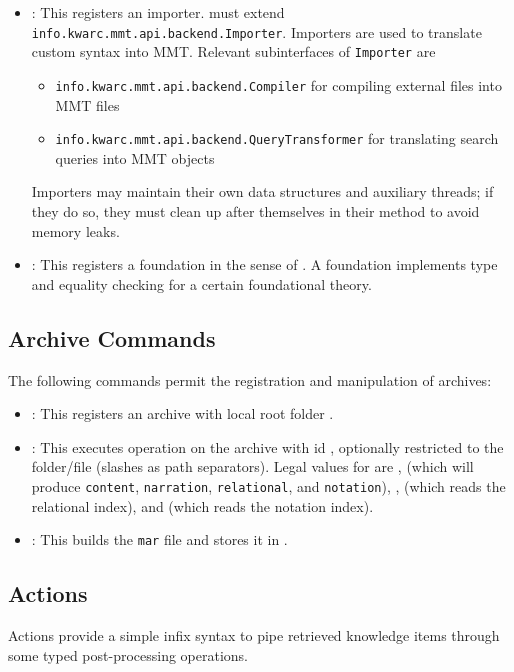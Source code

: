 \begin{itemize}
\item {}: This registers an importer.  must extend \texttt{info.kwarc.mmt.api.backend.Importer}. Importers are used to translate custom syntax into MMT. Relevant subinterfaces of \texttt{Importer} are
  \begin{itemize}
    \item \texttt{info.kwarc.mmt.api.backend.Compiler} for compiling external files into MMT files
    \item \texttt{info.kwarc.mmt.api.backend.QueryTransformer} for translating search queries into MMT objects
  \end{itemize}
Importers may maintain their own data structures and auxiliary threads; if they do so, they must clean up after themselves in their  method to avoid memory leaks.
\item {}: This registers a foundation in the sense of \cite{RK:mmt:10}. A foundation implements type and equality checking for a certain foundational theory.
\end{itemize}

\subsection{Archive Commands}\label{sec:shell:archives}
The following commands permit the registration and manipulation of archives:

\begin{itemize}
\item {}: This registers an archive with local root folder .
\item {}: This executes operation  on the archive with id , optionally restricted to the folder/file  (slashes as path separators). Legal values for  are ,  (which will produce \texttt{content}, \texttt{narration}, \texttt{relational}, and \texttt{notation}), ,  (which reads the relational index), and  (which reads the notation index).
\item {}: This builds the \texttt{mar} file and stores it in .
\end{itemize}

\subsection{Actions}\label{sec:shell:actions}
Actions provide a simple infix syntax to pipe retrieved knowledge items through some typed post-processing operations.

